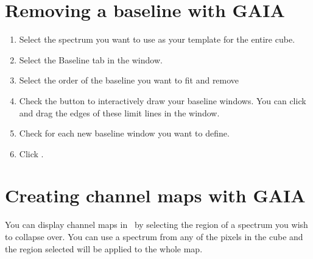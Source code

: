 \documentclass[11pt,oneside,chapters]{starlink}
\begin{document}
\section{Removing a baseline with GAIA}

\begin{enumerate}[label=(\textbf{\arabic*})]
\item Select the spectrum you want to use as your template for the entire cube.

\item Select the Baseline tab in the  window.

\item Select the order of the baseline you want to fit and remove

\item Check the  button to
interactively draw your baseline windows. You can click and drag the
edges of these limit lines in the  window.

\item Check  for each new baseline window you want to define.

\item Click .
\end{enumerate}


\section{Creating channel maps with GAIA}
\label{sec:gaiachannel}

You can display channel maps in \gaia\ by selecting the region of a
spectrum you wish to collapse over. You can use a spectrum from any of
the pixels in the cube and the region selected will be applied to the
whole map.
\end{document}
